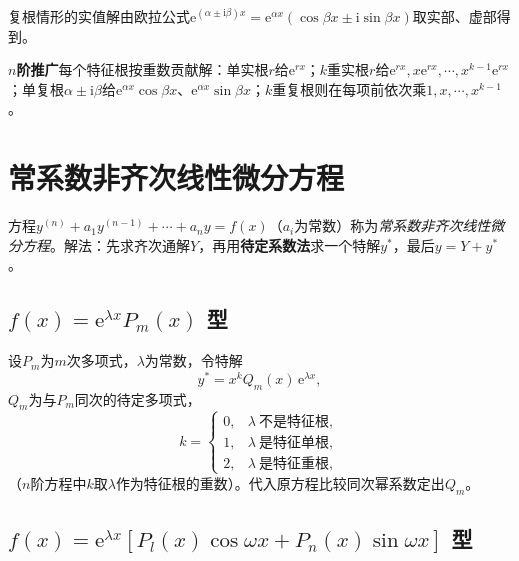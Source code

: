 \noindent 复根情形的实值解由欧拉公式$\mathrm{e}^{(\alpha\pm\mathrm{i}\beta)x}=\mathrm{e}^{\alpha x}(\cos\beta x\pm\mathrm{i}\sin\beta x)$取实部、虚部得到。

\noindent\textbf{$n$阶推广}\quad 每个特征根按重数贡献解：单实根$r$给$\mathrm{e}^{rx}$；$k$重实根$r$给$\mathrm{e}^{rx},x\mathrm{e}^{rx},\cdots,x^{k-1}\mathrm{e}^{rx}$；单复根$\alpha\pm\mathrm{i}\beta$给$\mathrm{e}^{\alpha x}\cos\beta x$、$\mathrm{e}^{\alpha x}\sin\beta x$；$k$重复根则在每项前依次乘$1,x,\cdots,x^{k-1}$。


\section{常系数非齐次线性微分方程}

\noindent 方程$y^{(n)}+a_1y^{(n-1)}+\cdots+a_ny=f(x)$（$a_i$为常数）称为\emph{常系数非齐次线性微分方程}。解法：先求齐次通解$Y$，再用\textbf{待定系数法}求一个特解$y^*$，最后$y=Y+y^*$。

\subsection{\texorpdfstring{$f(x)=\mathrm{e}^{\lambda x}P_m(x)$}{f(x)=e^(λx)P_m(x)} 型}

\noindent 设$P_m$为$m$次多项式，$\lambda$为常数，令特解
\[
y^*=x^{k}Q_m(x)\,\mathrm{e}^{\lambda x},
\]
$Q_m$为与$P_m$同次的待定多项式，
\[
k=\begin{cases}0, & \lambda\ \text{不是特征根},\\ 1, & \lambda\ \text{是特征单根},\\ 2, & \lambda\ \text{是特征重根},\end{cases}
\]
（$n$阶方程中$k$取$\lambda$作为特征根的重数）。代入原方程比较同次幂系数定出$Q_m$。


\subsection{\texorpdfstring{$f(x)=\mathrm{e}^{\lambda x}[P_l(x)\cos\omega x+P_n(x)\sin\omega x]$}{f=e^(λx)[Pl cos ωx+Pn sin ωx]} 型}

